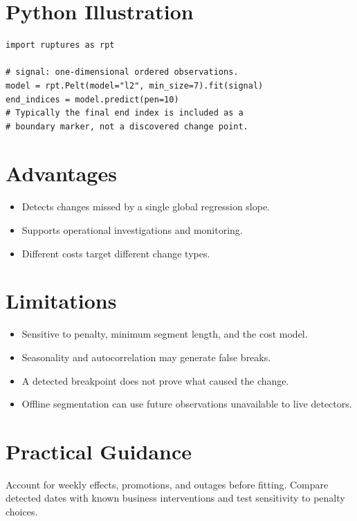 \documentclass[a4paper]{article}
\begin{document}
\section{Python Illustration}
\begin{verbatim}
import ruptures as rpt

# signal: one-dimensional ordered observations.
model = rpt.Pelt(model="l2", min_size=7).fit(signal)
end_indices = model.predict(pen=10)
# Typically the final end index is included as a
# boundary marker, not a discovered change point.
\end{verbatim}

\section{Advantages}
\begin{itemize}
 \item Detects changes missed by a single global regression slope.
 \item Supports operational investigations and monitoring.
 \item Different costs target different change types.
\end{itemize}

\section{Limitations}
\begin{itemize}
 \item Sensitive to penalty, minimum segment length, and the cost model.
 \item Seasonality and autocorrelation may generate false breaks.
 \item A detected breakpoint does not prove what caused the change.
 \item Offline segmentation can use future observations unavailable to live detectors.
\end{itemize}

\section{Practical Guidance}
Account for weekly effects, promotions, and outages before fitting. Compare detected dates with known business interventions and test sensitivity to penalty choices.



\end{document}
